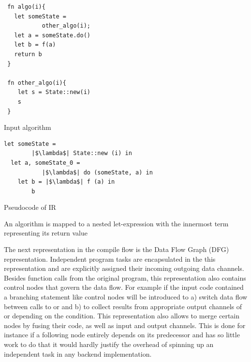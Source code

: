 \begin{codefigure}
    \centering
    \begin{subcodefigure}[b]{0.45\textwidth}
         \centering
         \begin{verbatim}
 fn algo(i){
   let someState = 
           other_algo(i);
   let a = someState.do()
   let b = f(a)
   return b
 }

 fn other_algo(i){
    let s = State::new(i)
    s
 }
            \end{verbatim}
         \caption{Input algorithm}
         \label{simplPyInput}
     \end{subcodefigure}
     \hfill
     \begin{subcodefigure}[b]{0.5\textwidth}
         \centering
         \begin{verbatim}
let someState = 
        |$\lambda$| State::new (i) in
  let a, someState_0 = 
           |$\lambda$| do (someState, a) in
    let b = |$\lambda$| f (a) in
        b
        \end{verbatim}
        \vspace{15mm}
    \caption{Pseudocode of IR}
         \label{simplIR}
    \end{subcodefigure}
\caption{An algorithm is mapped to a nested let-expression with the innermost term representing its return value}
\label{fig:funBodyTranslation}
\end{codefigure}

The next representation in the compile flow is the Data Flow Graph (DFG) representation. Independent program tasks are encapsulated in the this representation and are explicitly assigned their incoming outgoing data channels. Besides function calls from the original program, this representation also contains control nodes that govern the data flow. For example if the input code contained a branching statement like  control nodes will be introduced to a) switch data flow between calls to  or  and b) to collect results from appropriate output channels of  or  depending on the condition. This representation also allows to merge certain nodes by fusing their code, as well as input and output channels. This is done for instance if a following node entirely depends on its predecessor and has so little work to do that it would hardly justify the overhead of spinning up an independent task in any backend implementation.\\

